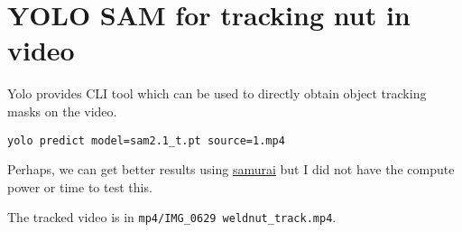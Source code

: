 \documentclass[11pt]{article}
\begin{document}
\section{YOLO SAM for tracking nut in video}
\label{sec:org4e21831}

Yolo provides CLI tool which can be used to directly obtain object tracking masks on the video.
\begin{verbatim}
yolo predict model=sam2.1_t.pt source=1.mp4
\end{verbatim}
Perhaps, we can get better results using \href{https://github.com/yangchris11/samurai}{samurai} but I did not have the compute power or time to test this.

The tracked video is in \texttt{mp4/IMG\_0629 weldnut\_track.mp4}.
\end{document}

